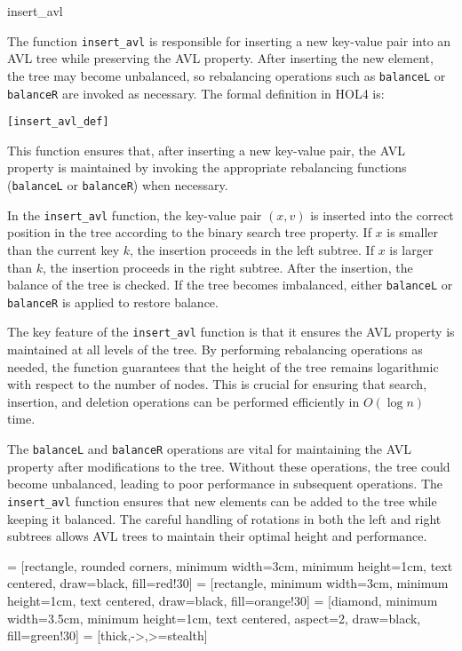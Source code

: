 \begin{defn}{insert\_avl}

The function \texttt{insert\_avl} is responsible for inserting a new key-value pair into an AVL tree while preserving the AVL property. After inserting the new element, the tree may become unbalanced, so rebalancing operations such as \texttt{balanceL} or \texttt{balanceR} are invoked as necessary. The formal definition in HOL4 is:

\begin{alltt}
	[insert_avl_def]
\end{alltt}


This function ensures that, after inserting a new key-value pair, the AVL property is maintained by invoking the appropriate rebalancing functions (\texttt{balanceL} or \texttt{balanceR}) when necessary.
\end{defn}

In the \texttt{insert\_avl} function, the key-value pair \( (x, v) \) is inserted into the correct position in the tree according to the binary search tree property. If \( x \) is smaller than the current key \( k \), the insertion proceeds in the left subtree. If \( x \) is larger than \( k \), the insertion proceeds in the right subtree. After the insertion, the balance of the tree is checked. If the tree becomes imbalanced, either \texttt{balanceL} or \texttt{balanceR} is applied to restore balance.

The key feature of the \texttt{insert\_avl} function is that it ensures the AVL property is maintained at all levels of the tree. By performing rebalancing operations as needed, the function guarantees that the height of the tree remains logarithmic with respect to the number of nodes. This is crucial for ensuring that search, insertion, and deletion operations can be performed efficiently in \( O(\log n) \) time.

The \texttt{balanceL} and \texttt{balanceR} operations are vital for maintaining the AVL property after modifications to the tree. Without these operations, the tree could become unbalanced, leading to poor performance in subsequent operations. The \texttt{insert\_avl} function ensures that new elements can be added to the tree while keeping it balanced. The careful handling of rotations in both the left and right subtrees allows AVL trees to maintain their optimal height and performance.

 = [rectangle, rounded corners, minimum width=3cm, minimum height=1cm, text centered, draw=black, fill=red!30]
 = [rectangle, minimum width=3cm, minimum height=1cm, text centered, draw=black, fill=orange!30]
 = [diamond, minimum width=3.5cm, minimum height=1cm, text centered, aspect=2, draw=black, fill=green!30]
 = [thick,->,>=stealth]


